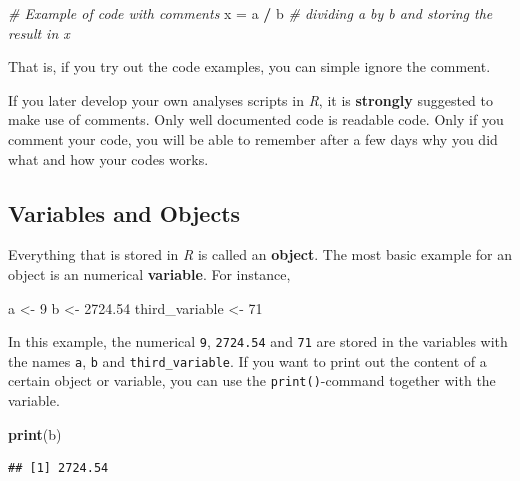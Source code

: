 \documentclass[
]{scrartcl}
\makeatletter
\newenvironment{Shaded}{\begin{snugshade}}{\end{snugshade}}
\newcommand{\CommentTok}[1]{\textcolor[rgb]{0.56,0.35,0.01}{\textit{#1}}}
\newcommand{\DecValTok}[1]{\textcolor[rgb]{0.00,0.00,0.81}{#1}}
\newcommand{\FloatTok}[1]{\textcolor[rgb]{0.00,0.00,0.81}{#1}}
\newcommand{\FunctionTok}[1]{\textcolor[rgb]{0.13,0.29,0.53}{\textbf{#1}}}
\newcommand{\NormalTok}[1]{#1}
\newcommand{\OtherTok}[1]{\textcolor[rgb]{0.56,0.35,0.01}{#1}}
\newcommand{\SpecialCharTok}[1]{\textcolor[rgb]{0.81,0.36,0.00}{\textbf{#1}}}
\newenvironment{kframe}{%
\medskip{}
\setlength{\fboxsep}{.8em}
 \def\at@end@of@kframe{}%
 \ifinner\ifhmode%
  \def\at@end@of@kframe{\end{minipage}}%
  \begin{minipage}{\columnwidth}%
 \fi\fi%
 \def\FrameCommand##1{\hskip\@totalleftmargin \hskip-\fboxsep
 \colorbox{shadecolor}{##1}\hskip-\fboxsep
     \hskip-\linewidth \hskip-\@totalleftmargin \hskip\columnwidth}%
 \MakeFramed {\advance\hsize-\width
   \@totalleftmargin\z@ \linewidth\hsize
   \@setminipage}}%
 {\par\unskip\endMakeFramed%
 \at@end@of@kframe}
\newenvironment{rmdblock}[1]
  {
  \begin{itemize}
  \renewcommand{\labelitemi}{
    \raisebox{-.7\height}[0pt][0pt]{
      {\setkeys{Gin}{width=3em,keepaspectratio}\texttt{[image: images/\#1]}}
    }
  }
  \setlength{\fboxsep}{1em}
  \begin{kframe}
  \item
  }
  {
  \end{kframe}
  \end{itemize}
  }
\newenvironment{important}
    {\begin{rmdblock}{hint}}
    {\end{rmdblock}}
\makeatother
\begin{document}
\begin{Shaded}
\begin{Highlighting}[]
\CommentTok{\# Example of code with comments}
\NormalTok{x }\OtherTok{=}\NormalTok{ a }\SpecialCharTok{/}\NormalTok{ b       }\CommentTok{\# dividing a by b and storing the result in x}
\end{Highlighting}
\end{Shaded}

That is, if you try out the code examples, you can simple ignore the comment.

\begin{important}
If you later develop your own analyses scripts in \emph{R}, it is
\textbf{strongly} suggested to make use of comments. Only well
documented code is readable code. Only if you comment your code, you
will be able to remember after a few days why you did what and how your
codes works.
\end{important}

\subsection{Variables and Objects}\label{variables-and-objects}

Everything that is stored in \emph{R} is called an \textbf{object}. The most basic example for an object is an numerical \textbf{variable}. For instance,

\begin{Shaded}
\begin{Highlighting}[]
\NormalTok{a }\OtherTok{\textless{}{-}} \DecValTok{9}
\NormalTok{b }\OtherTok{\textless{}{-}} \FloatTok{2724.54}
\NormalTok{third\_variable }\OtherTok{\textless{}{-}} \DecValTok{71}
\end{Highlighting}
\end{Shaded}

In this example, the numerical \texttt{9}, \texttt{2724.54} and \texttt{71} are stored in the variables with the names \texttt{a}, \texttt{b} and \texttt{third\_variable}.
If you want to print out the content of a certain object or variable, you can use the \texttt{print()}-command together with the variable.

\begin{Shaded}
\begin{Highlighting}[]
\FunctionTok{print}\NormalTok{(b)}
\end{Highlighting}
\end{Shaded}

\begin{verbatim}
## [1] 2724.54
\end{verbatim}
\end{document}
